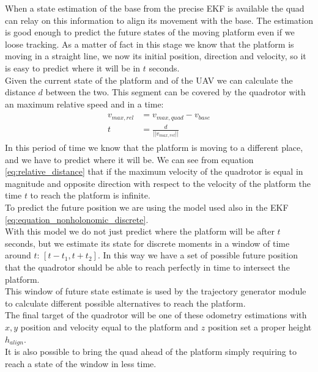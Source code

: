When a state estimation of the base from the precise EKF is available the quad can relay on this information
to align its movement with the base. The estimation is good enough to predict the future states of the moving platform even if we loose tracking. As a matter of fact in this stage we know that the platform is moving in a straight line, we now its initial position, direction and velocity, so it is easy to predict where it will be in $t$ seconds.\\

Given the current state of the platform and of the UAV we can calculate the distance $d$ between the two. This segment can be covered by the quadrotor with an maximum relative speed and in a time:
\begin{align}
\begin{split}
v_{max,rel} &= v_{max,quad} - v_{base}\\
t &= \frac{d}{||v_{max,rel}||}
\label{eq:relative_distance}
\end{split}
\end{align}
In this period of time we know that the platform is moving to a different place, and we have to predict where it will be. We can see from equation \ref{eq:relative_distance} that if the maximum velocity of the quadrotor  is equal in magnitude and opposite direction with respect to the velocity of the platform the time $t$ to reach the platform is infinite.\\
To predict the future position we are using the model used also in the EKF \ref{eq:equation_nonholonomic_discrete}.\\
With this model we do not just predict where the platform will be after $t$ seconds, but we estimate its state for discrete moments in a window of time around $t$: $[t-t_1,t+t_2]$. In this way we have a set of possible future position that the quadrotor should be able to reach perfectly in time to intersect the platform.\\
This window of future state estimate is used by the trajectory generator module to calculate different possible alternatives to reach the platform.\\
The final target of the quadrotor will be one of these odometry estimations with $x,y$ position and velocity equal to the platform and $z$ position set a proper height $h_{align}$.\\
It is also possible to bring the quad ahead of the platform simply requiring to reach a state of the window in less time.\\

